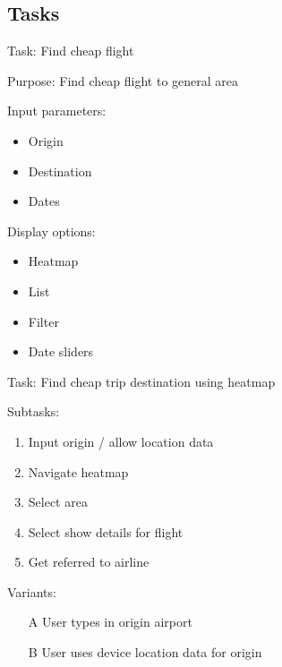 \subsection{Tasks}

\vspace*{1cm}
\begin{center}
\begin{mdframed}
Task: Find cheap flight
\end{mdframed}
\begin{mdframed}
Purpose: Find cheap flight to general area
\end{mdframed}
\begin{mdframed}
Input parameters:
\begin{itemize}
    \item Origin
    \item Destination
    \item Dates
\end{itemize}
\end{mdframed}
\begin{mdframed}
Display options:
\begin{itemize}
    \item Heatmap
    \item List
    \item Filter
    \item Date sliders
\end{itemize}
\end{mdframed}
\end{center}

\vspace*{2cm}
\begin{center}
\begin{mdframed}
Task: Find cheap trip destination using heatmap
\end{mdframed}
\begin{mdframed}
Subtasks:
\begin{enumerate}
    \item Input origin / allow location data
    \item Navigate heatmap
    \item Select area
    \item Select show details for flight
    \item Get referred to airline
\end{enumerate}
\end{mdframed}
\begin{mdframed}
Variants:
\begin{enumerate}
    \item[A] User types in origin airport
    \item[B] User uses device location data for origin
\end{enumerate}
\end{mdframed}
\end{center}

